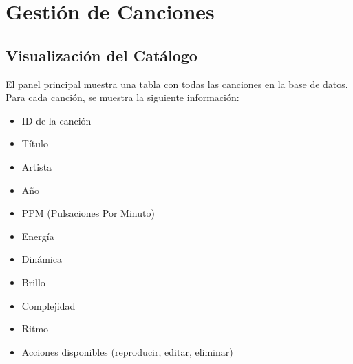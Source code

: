 \documentclass[a4paper,12pt]{article}
\begin{document}
\section{Gestión de Canciones}
\subsection{Visualización del Catálogo}
El panel principal muestra una tabla con todas las canciones en la base de datos. Para cada canción, se muestra la siguiente información:
\begin{itemize}
  \item ID de la canción
  \item Título
  \item Artista
  \item Año
  \item PPM (Pulsaciones Por Minuto)
  \item Energía
  \item Dinámica
  \item Brillo
  \item Complejidad
  \item Ritmo
  \item Acciones disponibles (reproducir, editar, eliminar)
\end{itemize}
\end{document}
